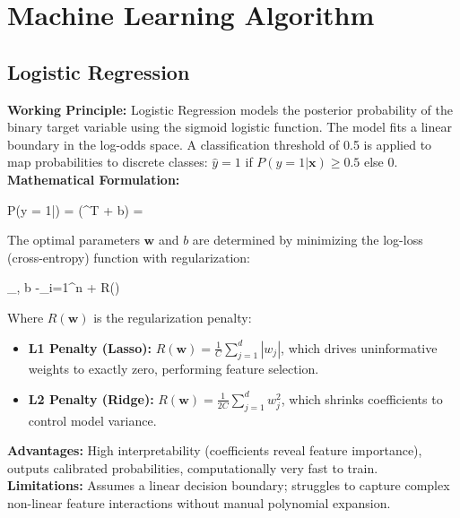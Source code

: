 \documentclass[12pt,a4paper]{article}
\begin{document}
\section{Machine Learning Algorithm}

\subsection{Logistic Regression}
\textbf{Working Principle:} Logistic Regression models the posterior probability of the binary target variable using the sigmoid logistic function. The model fits a linear boundary in the log-odds space. A classification threshold of 0.5 is applied to map probabilities to discrete classes: $\hat{y} = 1$ if $P(y=1|\mathbf{x}) \ge 0.5$ else $0$.\\
\textbf{Mathematical Formulation:}
\begin{equation{}}
    P(y = 1|) = \sigma(^T + b) = 
\end{equation{}}
The optimal parameters $\mathbf{w}$ and $b$ are determined by minimizing the log-loss (cross-entropy) function with regularization:
\begin{equation{}}
    \min_{, b} -\sum_{i=1}^n  + R()
\end{equation{}}
Where $R(\mathbf{w})$ is the regularization penalty:
\begin{itemize}
    \item \textbf{L1 Penalty (Lasso):} $R(\mathbf{w}) = \frac{1}{C} \sum_{j=1}^d |w_j|$, which drives uninformative weights to exactly zero, performing feature selection.
    \item \textbf{L2 Penalty (Ridge):} $R(\mathbf{w}) = \frac{1}{2C} \sum_{j=1}^d w_j^2$, which shrinks coefficients to control model variance.
\end{itemize}
\textbf{Advantages:} High interpretability (coefficients reveal feature importance), outputs calibrated probabilities, computationally very fast to train.\\
\textbf{Limitations:} Assumes a linear decision boundary; struggles to capture complex non-linear feature interactions without manual polynomial expansion.
\end{document}
